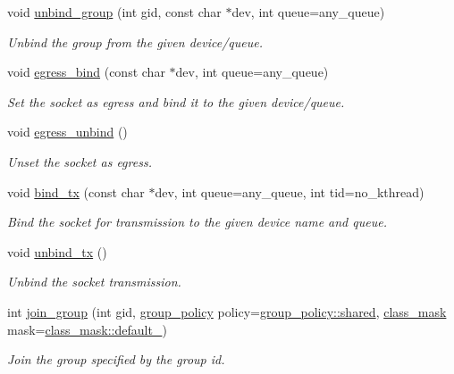\begin{DoxyCompactItemize}
void \hyperlink{classpfq_1_1socket_a6e1f7ee7f44b6824d734d4ff7046d907}{unbind\+\_\+group} (int gid, const char $\ast$dev, int queue=any\+\_\+queue)
\begin{DoxyCompactList}\small\item\em Unbind the group from the given device/queue. \end{DoxyCompactList}\item 
void \hyperlink{classpfq_1_1socket_a2c96741054ea764f5d8c31295ef5df29}{egress\+\_\+bind} (const char $\ast$dev, int queue=any\+\_\+queue)
\begin{DoxyCompactList}\small\item\em Set the socket as egress and bind it to the given device/queue. \end{DoxyCompactList}\item 
void \hyperlink{classpfq_1_1socket_ae80718e8f26cdaed3fd05bfde6d835e0}{egress\+\_\+unbind} ()
\begin{DoxyCompactList}\small\item\em Unset the socket as egress. \end{DoxyCompactList}\item 
void \hyperlink{classpfq_1_1socket_a177de236ffec9f988df80b5c1725ba96}{bind\+\_\+tx} (const char $\ast$dev, int queue=any\+\_\+queue, int tid=no\+\_\+kthread)
\begin{DoxyCompactList}\small\item\em Bind the socket for transmission to the given device name and queue. \end{DoxyCompactList}\item 
void \hyperlink{classpfq_1_1socket_a99ee5e145ccf3a043b3c2aacb3df30cc}{unbind\+\_\+tx} ()
\begin{DoxyCompactList}\small\item\em Unbind the socket transmission. \end{DoxyCompactList}\item 
int \hyperlink{classpfq_1_1socket_a118d0b045183cd226387e3851696c50f}{join\+\_\+group} (int gid, \hyperlink{namespacepfq_ac41249c8510558905b01fa4d866a38d7}{group\+\_\+policy} policy=\hyperlink{namespacepfq_ac41249c8510558905b01fa4d866a38d7a9e81e7b963c71363e2fb3eefcfecfc0e}{group\+\_\+policy\+::shared}, \hyperlink{namespacepfq_a96af1f5ed530eff563eb917516758fbb}{class\+\_\+mask} mask=\hyperlink{namespacepfq_a96af1f5ed530eff563eb917516758fbba172b03053216c6158fe380805998ad6c}{class\+\_\+mask\+::default\+\_\+})
\begin{DoxyCompactList}\small\item\em Join the group specified by the group id. \end{DoxyCompactList}\item 

\end{DoxyCompactItemize}
